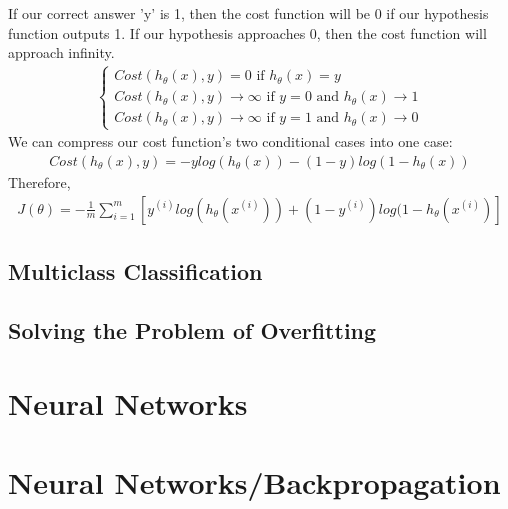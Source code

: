 \documentclass{article}
\begin{document}
                If our correct answer 'y' is 1, then the cost function will be 0 if our hypothesis function outputs 1. 
                If our hypothesis approaches 0, then the cost function will approach infinity.
                \begin{align*}
                    \begin{cases}
                        Cost(h_{\theta}(x),y) = 0 \text{ if } h_{\theta}(x) = y \\
                        Cost(h_{\theta}(x),y) \longrightarrow \infty \text{ if } y = 0 \text{ and } h_{\theta}(x) \longrightarrow 1 \\
                        Cost(h_{\theta}(x),y) \longrightarrow \infty \text{ if } y = 1 \text{ and } h_{\theta}(x) \longrightarrow 0
                    \end{cases}
                \end{align*}
                We can compress our cost function's two conditional cases into one case:
                \begin{align*}
                    Cost(h_{\theta}(x),y) = -ylog(h_{\theta}(x)) - (1-y)log(1-h_{\theta}(x))
                \end{align*}
                Therefore,
                \begin{align*}
                    J(\theta) = -\frac{1}{m}\sum_{i=1}^{m}[y^{(i)}log(h_{\theta}(x^{(i)})) + (1-y^{(i)})log(1-h_{\theta}(x^{(i)})]
                \end{align*}
            \subsection{Multiclass Classification}



            \subsection{Solving the Problem of Overfitting}



    \section{Neural Networks}

    \section{Neural Networks/Backpropagation}
\end{document}
